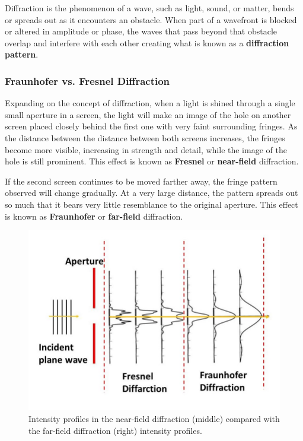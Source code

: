 \documentclass[12pt]{article}
\begin{document}
Diffraction is the phenomenon of a wave, such as light, sound, or matter, bends or spreads out as it encounters an obstacle. When part of a wavefront is blocked or altered in amplitude or phase,
the waves that pass beyond that obstacle overlap and interfere with each other creating what is known as a \textbf{diffraction pattern}. \cite{hecht2012optics,Born_Wolf_Bhatia_Clemmow_Gabor_Stokes_Taylor_Wayman_Wilcock_1999}

\subsubsection{Fraunhofer vs. Fresnel Diffraction} \label{sec:2.3.1}

Expanding on the concept of diffraction, when a light is shined through a single small aperture in a screen, the light will make an image of the hole on another screen placed closely behind the first one with very faint surrounding fringes.
As the distance between the distance between both screens increases, the fringes become more visible, increasing in strength and detail, while the image of the hole is still prominent. This effect is known as \textbf{Fresnel} or \textbf{near-field} diffraction. \cite{hecht2012optics,enwiki:1291861847,cowley1995diffraction}

If the second screen continues to be moved farther away, the fringe pattern observed will change gradually. At a very large distance, the pattern spreads out so much that it bears very little resemblance
to the original aperture. This effect is known as \textbf{Fraunhofer} or \textbf{far-field} diffraction. \cite{hecht2012optics,cowley1995diffraction}

\begin{figure}[H]
    \centering
    \includegraphics[width=.55\textwidth]{fraunfres.jpg}
    \caption{Intensity profiles in the near-field diffraction (middle) compared with the far-field diffraction (right) intensity profiles. \cite{phdthesis}}
    \label{fig:3}
\end{figure}
\end{document}
